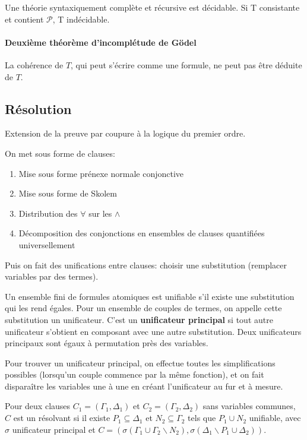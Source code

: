 \documentclass[french]{article}
\begin{document}
Une théorie syntaxiquement complète et récursive est décidable. Si T consistante et contient $\mathcal{P}$, T indécidable.

\paragraph{Deuxième théorème d'incomplétude de Gödel}
La cohérence de $T$, qui peut s'écrire comme une formule, ne peut pas être déduite de $T$.

\subsection{Résolution}
Extension de la preuve par coupure à la logique du premier ordre.

On met sous forme de clauses:
\begin{enumerate}
\item Mise sous forme prénexe normale conjonctive
\item Mise sous forme de Skolem
\item Distribution des $\forall$ sur les $\wedge$
\item Décomposition des conjonctions en ensembles de clauses quantifiées universellement
\end{enumerate}

Puis on fait des unifications entre clauses:
choisir une substitution (remplacer variables par des termes).

Un ensemble fini de formules atomiques est unifiable s'il existe une substitution qui les rend égales. Pour un ensemble de couples de termes, on appelle cette substitution un unificateur. C'est un \textbf{unificateur principal} si tout autre unificateur s'obtient en composant avec une autre substitution. Deux unificateurs principaux sont égaux à permutation près des variables.

Pour trouver un unificateur principal, on effectue toutes les simplifications possibles (lorsqu'un couple commence par la même fonction), et on fait disparaître les variables une à une en créant l'unificateur au fur et à mesure.

Pour deux clauses $C_1 = (\Gamma_1, \Delta_1)$ et  $C_2 = (\Gamma_2, \Delta_2)$ sans variables communes, $C$ est un résolvant si il existe $P_1\subseteq\Delta_1$ et $N_2\subseteq\Gamma_2$ tels que $P_1\cup N_2$ unifiable, avec $\sigma$ unificateur principal et $C = (\sigma(\Gamma_1\cup\Gamma_2\backslash N_2), \sigma(\Delta_1\backslash P_1\cup\Delta_2))$.
\end{document}
